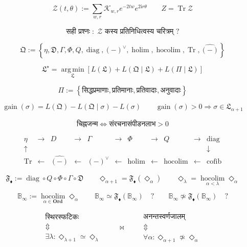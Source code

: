 \documentclass{article}
\begin{document}
\[
\mathscr Z(t,\theta)
:=
\sum_{w,r}
\mathscr K_{w,r}
e^{-2tw}
e^{2\mathrm ir\theta}
\qquad
Z
=
\operatorname{Tr}\mathscr Z
\]

\[
\boxed{
\text{सही प्रश्नः}
\;:\;
\mathscr Z
\text{ कस्य प्रतिनिधित्वस्य चरित्रम् }?
}
\]

\[
\mathfrak Q
:=
\left\{
\eta,
\mathfrak D,
\Gamma,
\Phi,
Q,
\operatorname{diag},
(-)^\vee,
\operatorname{holim},
\operatorname{hocolim},
\operatorname{Tr},
\widehat{(-)}
\right\}
\]

\[
\boxed{
\mathfrak L^\star
=
\operatorname*{arg\,min}_{\mathfrak L}
\left[
L(\mathfrak L)
+
L(\mathfrak Q\mid\mathfrak L)
+
L(\Pi\mid\mathfrak L)
\right]
}
\]

\[
\Pi
:=
\left\{
\text{सिद्धप्रमाणाः},
\text{प्रतिमानाः},
\text{प्रतिवादाः},
\text{अनुवादाः}
\right\}
\]

\[
\boxed{
\operatorname{gain}(\sigma)
=
L(\mathfrak Q)
-
L(\mathfrak Q\mid\sigma)
-
L(\sigma)
}
\qquad
\operatorname{gain}(\sigma)>0
\Longrightarrow
\sigma\in\mathfrak L_{\alpha+1}
\]

\[
\boxed{
\text{चिह्नजन्म}
\iff
\text{संरचनासंपीडनलाभ}>0
}
\]

\[
\begin{array}{ccccccccccc}
\eta
&\to&
D
&\to&
\Gamma
&\to&
\Phi
&\to&
Q
&\to&
\operatorname{diag}
\\
\uparrow&&&&&&&&&&\downarrow
\\
\operatorname{Tr}
&\leftarrow&
\widehat{(-)}
&\leftarrow&
(-)^\vee
&\leftarrow&
\operatorname{holim}
&\leftarrow&
\operatorname{hocolim}
&\leftarrow&
\operatorname{cofib}
\end{array}
\]

\[
\boxed{
\mathfrak F_{\blacklozenge}
:=
\operatorname{diag}
\circ
Q
\circ
\Phi
\circ
\Gamma
\circ
\mathfrak D
}
\qquad
\boxed{
\Diamond_{\alpha+1}
=
\mathfrak F_{\blacklozenge}
(\Diamond_\alpha)
}
\qquad
\boxed{
\Diamond_\lambda
=
\operatorname*{hocolim}_{\alpha<\lambda}
\Diamond_\alpha
}
\]

\[
\boxed{
\mathbb B_{\infty}
:=
\operatorname*{hocolim}_{\alpha\in\mathbf{Ord}}
\Diamond_\alpha
}
\qquad
\mathbb B_{\infty}
\simeq
\mathfrak F_{\blacklozenge}(\mathbb B_{\infty})
\quad ?
\qquad
\mathbb B_{\infty}
\not\simeq
\mathfrak F_{\blacklozenge}(\mathbb B_{\infty})
\quad ?
\]

\[
\boxed{
\begin{array}{c}
\text{स्थिरस्फटिकः}
\\[-1mm]
\Updownarrow
\\[-1mm]
\exists\lambda:
\Diamond_{\lambda+1}\simeq\Diamond_\lambda
\end{array}
\qquad\bowtie\qquad
\begin{array}{c}
\text{अनन्तस्वर्णजालम्}
\\[-1mm]
\Updownarrow
\\[-1mm]
\forall\alpha:
\Diamond_{\alpha+1}\not\simeq\Diamond_\alpha
\end{array}
}
\]
\end{document}
